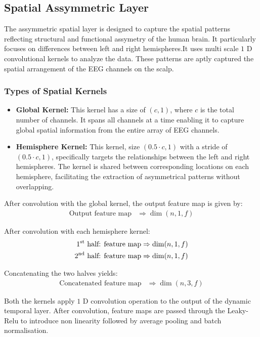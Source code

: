 \subsection*{Spatial Assymmetric Layer}
The assymmetric spatial layer is designed to capture the spatial patterns reflecting structural and functional assymetry of the human brain. It particularly focuses on differences between left and right hemispheres.It uses multi scale  $1$ D convolutional kernels to analyze the data. These patterns are aptly captured the spatial arrangement of the EEG channels on the scalp.
\subsubsection*{Types of Spatial Kernels}

\begin{itemize}
    \item \textbf{Global Kernel:} This kernel has a size of \((c, 1)\), where \(c\) is the total number of channels. It spans all channels at a time enabling it to capture global spatial information from the entire array of EEG channels.
    \item \textbf{Hemisphere Kernel:} This kernel, size \((0.5 \cdot c, 1)\) with a stride of \((0.5 \cdot c, 1)\), specifically targets the relationships between the left and right hemispheres. The kernel is shared between corresponding locations on each hemisphere, facilitating the extraction of asymmetrical patterns without overlapping.
\end{itemize}
After convolution with the global kernel, the output feature map is given by:
\begin{align*}
    \text{Output feature map} &\Rightarrow \dim(n, 1, f)
\end{align*}

After convolution with each hemisphere kernel:
\begin{align*}
    \text{1\textsuperscript{st} half: feature map} &\Rightarrow \dim(n, 1, f) \\
    \text{2\textsuperscript{nd} half: feature map} &\Rightarrow \dim(n, 1 , f)
\end{align*}

Concatenating the two halves yields:
\begin{align*}
    \text{Concatenated feature map} &\Rightarrow \dim(n, 3, f)
\end{align*}

Both the kernels apply $1$ D convolution operation to the output of the dynamic temporal layer. After convolution, feature maps are passed through the Leaky-Relu to introduce non linearity followed by average pooling and batch normalisation.

